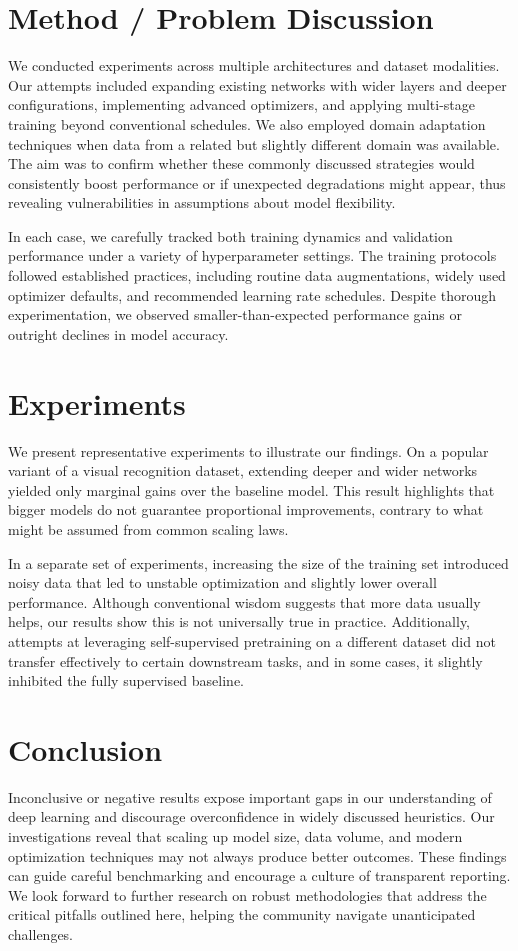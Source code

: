\documentclass{article}
\begin{document}
\section{Method / Problem Discussion}
We conducted experiments across multiple architectures and dataset modalities. Our attempts included expanding existing networks with wider layers and deeper configurations, implementing advanced optimizers, and applying multi-stage training beyond conventional schedules. We also employed domain adaptation techniques when data from a related but slightly different domain was available. The aim was to confirm whether these commonly discussed strategies would consistently boost performance or if unexpected degradations might appear, thus revealing vulnerabilities in assumptions about model flexibility.

In each case, we carefully tracked both training dynamics and validation performance under a variety of hyperparameter settings. The training protocols followed established practices, including routine data augmentations, widely used optimizer defaults, and recommended learning rate schedules. Despite thorough experimentation, we observed smaller-than-expected performance gains or outright declines in model accuracy.

\section{Experiments}
We present representative experiments to illustrate our findings. On a popular variant of a visual recognition dataset, extending deeper and wider networks yielded only marginal gains over the baseline model. This result highlights that bigger models do not guarantee proportional improvements, contrary to what might be assumed from common scaling laws. 

In a separate set of experiments, increasing the size of the training set introduced noisy data that led to unstable optimization and slightly lower overall performance. Although conventional wisdom suggests that more data usually helps, our results show this is not universally true in practice. Additionally, attempts at leveraging self-supervised pretraining on a different dataset did not transfer effectively to certain downstream tasks, and in some cases, it slightly inhibited the fully supervised baseline.

\section{Conclusion}
Inconclusive or negative results expose important gaps in our understanding of deep learning and discourage overconfidence in widely discussed heuristics. Our investigations reveal that scaling up model size, data volume, and modern optimization techniques may not always produce better outcomes. These findings can guide careful benchmarking and encourage a culture of transparent reporting. We look forward to further research on robust methodologies that address the critical pitfalls outlined here, helping the community navigate unanticipated challenges.


\end{document}
